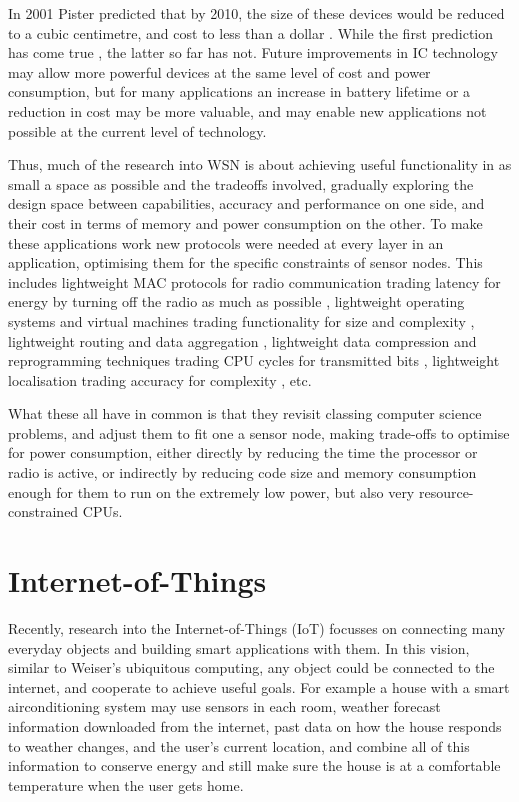 In 2001 Pister predicted that by 2010, the size of these devices would be reduced to a cubic centimetre, and cost to less than a dollar \cite{Pister:2001vr}. While the first prediction has come true \cite{Wang:2014cq}, the latter so far has not. Future improvements in IC technology may allow more powerful devices at the same level of cost and power consumption, but for many applications an increase in battery lifetime or a reduction in cost may be more valuable, and may enable new applications not possible at the current level of technology.

Thus, much of the research into WSN is about achieving useful functionality in as small a space as possible and the tradeoffs involved, gradually exploring the design space between capabilities, accuracy and performance on one side, and their cost in terms of memory and power consumption on the other.
%
To make these applications work new protocols were needed at every layer in an application, optimising them for the specific constraints of sensor nodes. This includes lightweight MAC protocols for radio communication trading latency for energy by turning off the radio as much as possible \cite{Ye:2002uv, vanDam:2018tr}, lightweight operating systems and virtual machines trading functionality for size and complexity \cite{Levis:2004ws, Gu:2006ww, Han:2005tha, Levis:2002ku, Brouwers:2009cj}, lightweight routing and data aggregation \cite{Intanogonwiwat:2018wz, Braginsky:2002wg}, lightweight data compression and reprogramming techniques trading CPU cycles for transmitted bits \cite{Marcelloni:2009ja, Reijers:2003ww}, lightweight localisation trading accuracy for complexity \cite{Niculescu:2001bl, Savarese:2002tx, Savvides:2002uf}, etc.

What these all have in common is that they revisit classing computer science problems, and adjust them to fit one a sensor node, making trade-offs to optimise for power consumption, either directly by reducing the time the processor or radio is active, or indirectly by reducing code size and memory consumption enough for them to run on the extremely low power, but also very resource-constrained CPUs.

\section{Internet-of-Things}
\label{sec-introduction-iot}
Recently, research into the Internet-of-Things (IoT) focusses on connecting many everyday objects and building smart applications with them. In this vision, similar to Weiser's ubiquitous computing, any object could be connected to the internet, and cooperate to achieve useful goals. For example a house with a smart airconditioning system may use sensors in each room, weather forecast information downloaded from the internet, past data on how the house responds to weather changes, and the user's current location, and combine all of this information to conserve energy and still make sure the house is at a comfortable temperature when the user gets home.

